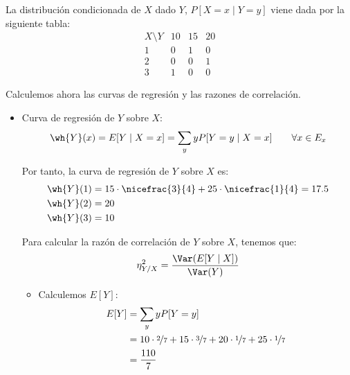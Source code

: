 \begin{ejercicio}
\begin{enumerate}
        La distribución condicionada de $X$ dado $Y$, $P[X = x\mid Y = y]$ viene dada por la siguiente tabla:
        \begin{equation*}
            \begin{array}{c|ccc}
                X\setminus Y & 10 & 15 & 20\\
                \hline
                1 & 0 & 1 & 0\\
                2 & 0 & 0 & 1\\
                3 & 1 & 0 & 0
            \end{array}
        \end{equation*}

        Calculemos ahora las curvas de regresión y las razones de correlación.
        \begin{itemize}
            \item Curva de regresión de $Y$ sobre $X$:
            \begin{equation*}
                \wh{Y}(x) = E[Y\mid X = x] = \sum_{y} y P[Y = y\mid X = x] \qquad \forall x\in E_x
            \end{equation*}

            Por tanto, la curva de regresión de $Y$ sobre $X$ es:
            \begin{align*}
                \wh{Y}(1) &= 15\cdot \nicefrac{3}{4} + 25\cdot \nicefrac{1}{4} = 17.5\\
                \wh{Y}(2) &= 20\\
                \wh{Y}(3) &= 10
            \end{align*}

            Para calcular la razón de correlación de $Y$ sobre $X$, tenemos que:
            \begin{equation*}
                \eta^2_{Y/X} = \dfrac{\Var(E[Y\mid X])}{\Var(Y)}
            \end{equation*}
            \begin{itemize}
                \item Calculemos $E[Y]$:
                \begin{align*}
                    E[Y] &= \sum_{y} y P[Y = y]\\
                    &= 10 \cdot \nicefrac{2}{7} + 15 \cdot \nicefrac{3}{7} + 20 \cdot \nicefrac{1}{7} + 25 \cdot \nicefrac{1}{7}\\
                    &= \frac{110}{7}
                \end{align*}


\end{itemize}
\end{itemize}
\end{enumerate}
\end{ejercicio}

